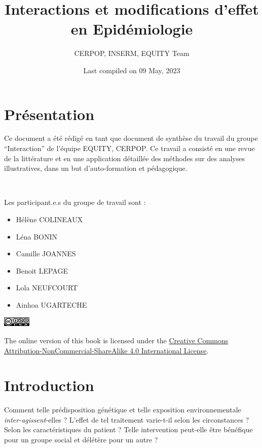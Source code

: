 \documentclass[
]{book}
\title{Interactions et modifications d'effet en Epidémiologie}
\author{CERPOP, INSERM, EQUITY Team}
\date{Last compiled on 09 May, 2023}
\providecommand{\tightlist}{%
  \setlength{\itemsep}{0pt}\setlength{\parskip}{0pt}}
\begin{document}
\maketitle

{
\setcounter{tocdepth}{1}
\tableofcontents
}
\hypertarget{pruxe9sentation}{%
\chapter{Présentation}\label{pruxe9sentation}}

Ce document a été rédigé en tant que document de synthèse du travail du groupe ``Interaction'' de l'équipe EQUITY, CERPOP.
Ce travail a consisté en une revue de la littérature et en une application détaillée des méthodes sur des analyses illustratives, dans un but d'auto-formation et pédagogique.

\includegraphics[width=0\textwidth,height=\textheight]{img/Image0.png}

Les participant.e.s du groupe de travail sont :

\begin{itemize}
\tightlist
\item
  Hélène COLINEAUX\\
\item
  Léna BONIN
\item
  Camille JOANNES
\item
  Benoit LEPAGE
\item
  Lola NEUFCOURT
\item
  Ainhoa UGARTECHE
\end{itemize}

\includegraphics[width=0.1\textwidth,height=\textheight]{img/by-nc-sa.png}

The online version of this book is licensed under the \href{https://creativecommons.org/licenses/by-nc-sa/4.0/}{Creative Commons Attribution-NonCommercial-ShareAlike 4.0 International License}.

\hypertarget{introduction}{%
\chapter{Introduction}\label{introduction}}

Comment telle prédisposition génétique et telle exposition environnementale \emph{inter-agissent}-elles ? L'effet de tel traitement varie-t-il selon les circonstances ? Selon les caractéristiques du patient ? Telle intervention peut-elle être bénéfique pour un groupe social et délétère pour un autre ?
\end{document}
